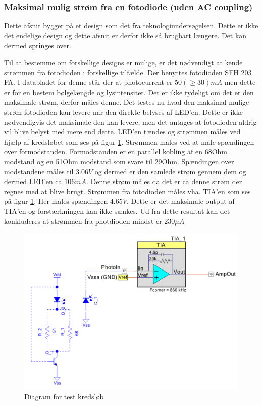 \documentclass[HardwareDesign/HardwareDesign_main.tex]{subfiles}
\begin{document}
\subsubsection{Maksimal mulig strøm fra en fotodiode (uden AC coupling)} \label{sec:CupSensorCurrentTest}
{
Dette afsnit bygger på et design som det fra teknologiundersøgelsen. Dette er ikke det endelige design og dette afsnit er derfor ikke så brugbart længere. Det kan dermed springes over.

Til at bestemme om forskellige designs er mulige, er det nødvendigt at kende strømmen fra fotodioden i forskellige tilfælde.
Der benyttes fotodioden SFH 203 FA. I databladet for denne står der at photocurrent er $50 (\geq 30) \si{mA}$ men dette er for en bestem bølgelængde og lysintensitet. Det er ikke tydeligt om det er den maksimale strøm, derfor måles denne.
Det testes nu hvad den maksimal mulige strøm fotodioden kan levere når den direkte belyses af LED'en. Dette er ikke nødvendigvis det maksimale den kan levere, men det antages at fotodioden aldrig vil blive belyst med mere end dette.
LED'en tændes og strømmen måles ved hjælp af kredsløbet som ses på figur \ref{fig:PhotodiodeTestDiagram}. Strømmen måles ved at måle spændingen over formodstanden. Formodstanden er en parallel kobling af en 68Ohm modstand og en 51Ohm modstand som svare til 29Ohm. Spændingen over modstandene måles til $3.06\si{V}$ og dermed er den samlede strøm gennem dem og dermed LED'en ca $106\si{mA}$. Denne strøm måles da det er ca denne strøm der regnes med at blive brugt. Strømmen fra fotodioden måles vha. TIA'en som ses på figur \ref{fig:PhotodiodeTestDiagram}. Her måles spændingen $4.65V$. Dette er det maksimale output af TIA'en og forstærkningen kan ikke sænkes. Ud fra dette resultat kan det konkluderes at strømmen fra photdioden mindst er $230\si{\mu A}$

\begin{figure}[H]
    \centering
    \includegraphics[width=\textwidth]{HardwareDesign/CupSensor/graphics/DiodeCurrentTestDiagram.PNG}
    \caption{Diagram for test kredsløb}
    \label{fig:PhotodiodeTestDiagram}
\end{figure}

}
\end{document}
